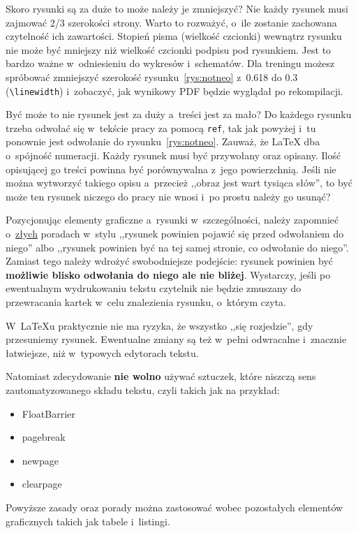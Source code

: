 Skoro rysunki są za duże to może należy je zmniejszyć? Nie każdy rysunek musi zajmować 2/3 szerokości strony. Warto to rozważyć, o~ile zostanie zachowana czytelność ich zawartości. Stopień pisma (wielkość czcionki) wewnątrz rysunku nie może być mniejszy niż wielkość czcionki podpisu pod rysunkiem. Jest to bardzo ważne w~odniesieniu do wykresów i~schematów. Dla treningu możesz spróbować zmniejszyć szerokość rysunku~\ref{rys:notneo} z~0.618 do 0.3 (\texttt{\textbackslash linewidth}) i~zobaczyć, jak wynikowy PDF będzie wyglądał po rekompilacji.

Być może to nie rysunek jest za duży a~treści jest za mało? Do każdego rysunku trzeba odwołać się w~tekście pracy za pomocą \texttt{ref}, tak jak powyżej i~tu ponownie jest odwołanie do rysunku~\ref{rys:notneo}. Zauważ, że \LaTeX{} dba o~spójność numeracji. Każdy rysunek musi być przywołany oraz opisany. Ilość opisującej go treści powinna być porównywalna z~jego powierzchnią. Jeśli nie można wytworzyć takiego opisu a~przecież ,,obraz jest wart tysiąca słów'', to być może ten rysunek niczego do pracy nie wnosi i~po prostu należy go usunąć?

Pozycjonując elementy graficzne a~rysunki w~szczególności, należy zapomnieć o~\underline{złych} poradach w~stylu ,,rysunek powinien pojawić się przed odwołaniem do niego'' albo ,,rysunek powinien być na tej samej stronie, co odwołanie do niego''. Zamiast tego należy wdrożyć swobodniejsze podejście: rysunek powinien być \textbf{możliwie blisko odwołania do niego ale nie bliżej}. Wystarczy, jeśli po ewentualnym wydrukowaniu tekstu czytelnik nie będzie zmuszany do przewracania kartek w~celu znalezienia rysunku, o~którym czyta.

W~\LaTeX{u} praktycznie nie ma ryzyka, że wszystko ,,się rozjedzie'', gdy przesuniemy rysunek. Ewentualne zmiany są też w~pełni odwracalne i~znacznie łatwiejsze, niż w~typowych edytorach tekstu.

Natomiast zdecydowanie \textbf{nie wolno} używać sztuczek, które niszczą sens zautomatyzowanego składu tekstu, czyli takich jak na przykład:
\begin{itemize}
	\item FloatBarrier
	\item pagebreak
	\item newpage
	\item clearpage
\end{itemize}

Powyższe zasady oraz porady można zastosować wobec pozostałych elementów graficznych takich jak tabele i~listingi.

